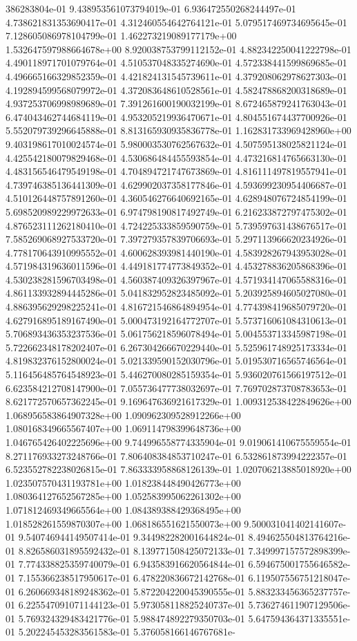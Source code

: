 386283804e-01	9.438953561073794019e-01	6.936472550268244497e-01	4.738621831353690417e-01	4.312460554642764121e-01	5.079517469734695645e-01	7.128605086978104799e-01	1.462273219089177179e+00	1.532647597988664678e+00	8.920038753799112152e-01	4.882342250041222798e-01	4.490118971701079764e-01	4.510537048335274690e-01	4.572338441599869685e-01	4.496665166329852359e-01	4.421824131545739611e-01	4.379208062978627303e-01	4.192894599568079972e-01	4.372083648610528561e-01	4.582478868200318689e-01	4.937253706998989689e-01	7.391261600190032199e-01	8.672465879241763043e-01	6.474043462744684119e-01	4.953205219936470671e-01	4.804551674437700926e-01	5.552079739296645888e-01	8.813165930935836778e-01	1.162831733969428960e+00	9.403198617010024574e-01	5.980003530762567632e-01	4.507595138025821124e-01	4.425542180079829468e-01	4.530686484455593854e-01	4.473216814765663130e-01	4.483156546479549198e-01	4.704894721747673869e-01	4.816111497819557941e-01	4.739746385136441309e-01	4.629902037358177846e-01	4.593699230954406687e-01	4.510126448757891260e-01	4.360546276640692165e-01	4.628948076724854199e-01	5.698520989229972633e-01	6.974798190817492749e-01	6.216233872797475302e-01	4.876523111262180410e-01	4.724225333859590759e-01	5.739597631438676517e-01	7.585269068927533720e-01	7.397279357839706693e-01	5.297113966620234926e-01	4.778170643910995552e-01	4.600628393981440190e-01	4.583928267943953028e-01	4.571984319636011596e-01	4.449181774773849352e-01	4.453278836205868396e-01	4.530238281596703498e-01	4.560387409326397967e-01	4.571934147065588316e-01	4.861133932894445286e-01	5.041832952823485092e-01	5.203925894605027080e-01	4.886395629298225241e-01	4.816721546864894954e-01	4.774398419685079720e-01	4.627916895189167490e-01	5.000473192164772707e-01	5.573716061084310613e-01	5.706893436353237536e-01	5.061756218596078494e-01	5.004553713345987198e-01	5.722662348178202407e-01	6.267304266670229440e-01	5.525961748925173334e-01	4.819832376152800024e-01	5.021339590152030796e-01	5.019530716565746564e-01	5.116456485764548923e-01	5.446270080285159354e-01	5.936020761566197512e-01	6.623584212708147900e-01	7.055736477738032697e-01	7.769702873708783653e-01	8.621772570657362245e-01	9.169647636921617329e-01	1.009312538422849626e+00	1.068956583864907328e+00	1.090962309528912266e+00	1.080168349665567407e+00	1.069114798399648736e+00	1.046765426402225696e+00	9.744996558774335904e-01	9.019061410675559554e-01	8.271176933273248766e-01	7.806408384853710247e-01	6.532861873994222357e-01	6.523552782238026815e-01	7.863333958868126139e-01	1.020706213885018920e+00	1.023507570431193781e+00	1.018238448490426773e+00	1.080364127652567285e+00	1.052583995062261302e+00	1.071812469349665564e+00	1.084389388429368495e+00	1.018528261559870307e+00	1.068186551621550073e+00	9.500031041402141607e-01	9.540746944149507414e-01	9.344982282001644824e-01	8.494625504813764216e-01	8.826586031895592432e-01	8.139771508425072133e-01	7.349997157572898399e-01	7.774338825359740079e-01	6.943583916620564844e-01	6.594675001755646582e-01	7.155366238517950617e-01	6.478220836672142768e-01	6.119507556751218047e-01	6.260669348189248362e-01	5.872204220045390555e-01	5.883233456365237757e-01	6.225547091071144123e-01	5.973058118825240737e-01	5.736274611907129506e-01	5.769324329483421776e-01	5.988474892279350703e-01	5.647594364371335551e-01	5.202245453283561583e-01	5.376058166146767681e-